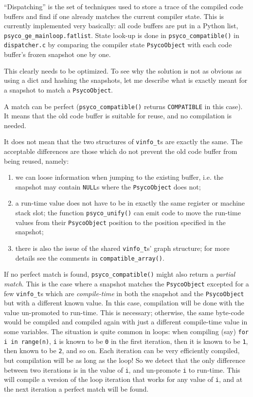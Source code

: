 \documentclass{article}
\def\code#1{\texttt{#1}}
\begin{document}
``Dispatching'' is the set of techniques used to store a trace of the compiled code buffers and find if one already matches the current compiler state. This is currently implemented very basically: all code buffers are put in a Python list, \code{psyco_ge_mainloop.fatlist}. State look-up is done in \code{psyco_compatible()} in \code{dispatcher.c} by comparing the compiler state \code{PsycoObject} with each code buffer's frozen snapshot one by one.

This clearly needs to be optimized. To see why the solution is not as obvious as using a dict and hashing the snapshots, let me describe what is exactly meant for a snapshot to match a \code{PsycoObject}.

A match can be perfect (\code{psyco_compatible()} returns \code{COMPATIBLE} in this case). It means that the old code buffer is suitable for reuse, and no compilation is needed.

It does not mean that the two structures of \code{vinfo_t}s are exactly the same. The acceptable differences are those which do not prevent the old code buffer from being reused, namely:

\begin{enumerate}
\item we can loose information when jumping to the existing buffer, i.e. the snapshot may contain \code{NULL}s where the \code{PsycoObject} does not;
\item a run-time value does not have to be in exactly the same register or machine stack slot; the function \code{psyco_unify()} can emit code to move the run-time values from their \code{PsycoObject} position to the position specified in the snapshot;
\item there is also the issue of the shared \code{vinfo_t}s' graph structure; for more details see the comments in \code{compatible_array()}.
\end{enumerate}

If no perfect match is found, \code{psyco_compatible()} might also return a \emph{partial match}. This is the case where a snapshot matches the \code{PsycoObject} excepted for a few \code{vinfo_t}s which are \emph{compile-time} in both the snapshot and the \code{PsycoObject} but with a different known value. In this case, compilation will be done with the value un-promoted to run-time. This is necessary; otherwise, the same byte-code would be compiled and compiled again with just a different compile-time value in some variables. The situation is quite common in loops: when compiling (say) \code{for i in range(n)}, \code{i} is known to be \code{0} in the first iteration, then it is known to be \code{1}, then known to be \code{2}, and so on. Each iteration can be very efficiently compiled, but compilation will be as long as the loop! So we detect that the only difference between two iterations is in the value of \code{i}, and un-promote \code{i} to run-time. This will compile a version of the loop iteration that works for any value of \code{i}, and at the next iteration a perfect match will be found.
\end{document}
